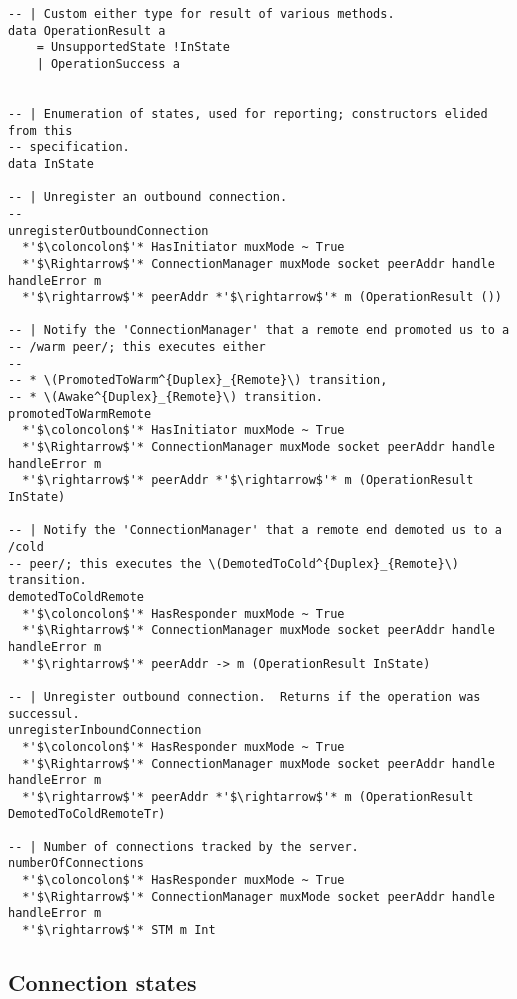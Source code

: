 \documentclass{article}
\begin{document}
\begin{lstlisting}
-- | Custom either type for result of various methods.
data OperationResult a
    = UnsupportedState !InState
    | OperationSuccess a


-- | Enumeration of states, used for reporting; constructors elided from this
-- specification.
data InState

-- | Unregister an outbound connection.
-- 
unregisterOutboundConnection
  *'$\coloncolon$'* HasInitiator muxMode ~ True
  *'$\Rightarrow$'* ConnectionManager muxMode socket peerAddr handle handleError m
  *'$\rightarrow$'* peerAddr *'$\rightarrow$'* m (OperationResult ())

-- | Notify the 'ConnectionManager' that a remote end promoted us to a
-- /warm peer/; this executes either
--
-- * \(PromotedToWarm^{Duplex}_{Remote}\) transition,
-- * \(Awake^{Duplex}_{Remote}\) transition.
promotedToWarmRemote
  *'$\coloncolon$'* HasInitiator muxMode ~ True
  *'$\Rightarrow$'* ConnectionManager muxMode socket peerAddr handle handleError m
  *'$\rightarrow$'* peerAddr *'$\rightarrow$'* m (OperationResult InState)

-- | Notify the 'ConnectionManager' that a remote end demoted us to a /cold
-- peer/; this executes the \(DemotedToCold^{Duplex}_{Remote}\) transition.
demotedToColdRemote
  *'$\coloncolon$'* HasResponder muxMode ~ True
  *'$\Rightarrow$'* ConnectionManager muxMode socket peerAddr handle handleError m
  *'$\rightarrow$'* peerAddr -> m (OperationResult InState)

-- | Unregister outbound connection.  Returns if the operation was successul.
unregisterInboundConnection
  *'$\coloncolon$'* HasResponder muxMode ~ True
  *'$\Rightarrow$'* ConnectionManager muxMode socket peerAddr handle handleError m
  *'$\rightarrow$'* peerAddr *'$\rightarrow$'* m (OperationResult DemotedToColdRemoteTr)

-- | Number of connections tracked by the server.
numberOfConnections
  *'$\coloncolon$'* HasResponder muxMode ~ True
  *'$\Rightarrow$'* ConnectionManager muxMode socket peerAddr handle handleError m
  *'$\rightarrow$'* STM m Int
\end{lstlisting}

\subsection{Connection states}
\end{document}
